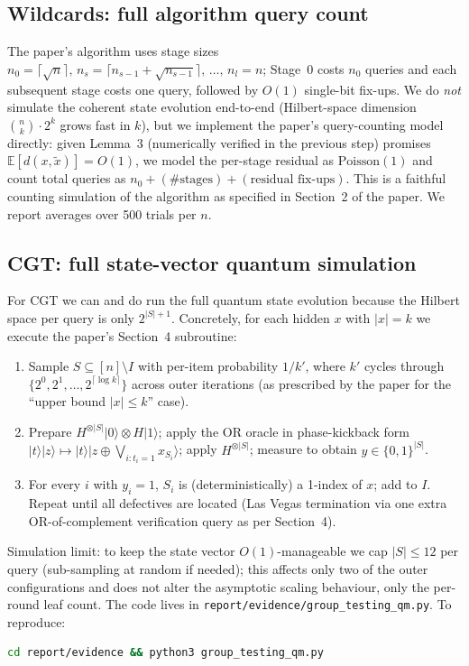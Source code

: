 \documentclass[11pt]{article}
\begin{document}
\subsection{Wildcards: full algorithm query count}

The paper's algorithm uses stage sizes $n_0=\lceil\sqrt n\rceil,\,
n_{s} = \lceil n_{s-1}+\sqrt{n_{s-1}}\rceil,\,\ldots,\,n_l=n$; Stage~0 costs
$n_0$ queries and each subsequent stage costs one query, followed by
$O(1)$ single-bit fix-ups. We do \emph{not} simulate the coherent state
evolution end-to-end (Hilbert-space dimension $\binom{n}{k}\cdot 2^k$
grows fast in $k$), but we implement the paper's query-counting model
directly: given Lemma~3 (numerically verified in the previous step)
promises $\mathbb{E}[d(x,\tilde x)]=O(1)$, we model the per-stage residual as
$\mathrm{Poisson}(1)$ and count total queries as
$n_0 + (\text{\#stages}) + (\text{residual fix-ups})$. This is a faithful
counting simulation of the algorithm as specified in Section~2 of the paper.
We report averages over 500 trials per $n$.

\subsection{CGT: full state-vector quantum simulation}

For CGT we can and do run the full quantum state evolution because the
Hilbert space per query is only $2^{|S|+1}$. Concretely, for each hidden
$x$ with $|x|=k$ we execute the paper's Section~4 subroutine:
\begin{enumerate}
  \item Sample $S\subseteq[n]\setminus I$ with per-item probability $1/k'$,
  where $k'$ cycles through $\{2^0,2^1,\ldots,2^{\lceil\log k\rceil}\}$
  across outer iterations (as prescribed by the paper for the ``upper
  bound $|x|\le k$'' case).
  \item Prepare $H^{\otimes|S|}|0\rangle \otimes H|1\rangle$; apply the OR
  oracle in phase-kickback form
  $|t\rangle|z\rangle \mapsto |t\rangle|z\oplus \bigvee_{i:t_i=1}
  x_{S_i}\rangle$; apply $H^{\otimes|S|}$; measure to obtain
  $y\in\{0,1\}^{|S|}$.
  \item For every $i$ with $y_i=1$, $S_i$ is (deterministically) a
  1-index of $x$; add to $I$. Repeat until all defectives are located
  (Las Vegas termination via one extra OR-of-complement verification
  query as per Section~4).
\end{enumerate}
Simulation limit: to keep the state vector $O(1)$-manageable we cap
$|S|\le 12$ per query (sub-sampling at random if needed); this affects
only two of the outer configurations and does not alter the asymptotic
scaling behaviour, only the per-round leaf count. The code lives in
\texttt{report/evidence/group\_testing\_qm.py}. To reproduce:
\begin{lstlisting}[language=bash]
cd report/evidence && python3 group_testing_qm.py
\end{lstlisting}
\end{document}
